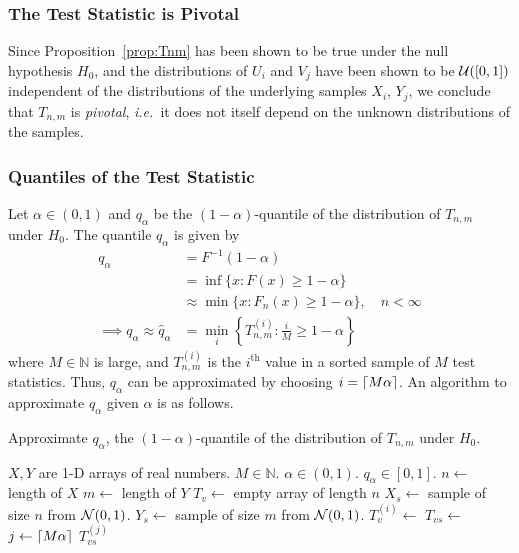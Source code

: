 \documentclass[letterpaper, oneside, reqno]{amsart}
\numberwithin{equation}{section}
\DeclarePairedDelimiter{\ceil}{\lceil}{\rceil}
\newcommand{\ie}{\emph{i.e.\ }}
\newcommand{\N}[2]{\mathcal{N}\mleft( #1, #2 \mright)}
\newcommand{\U}[2]{\mathcal{U}\mleft(\mleft[ #1, #2 \mright]\mright)}
\begin{document}
\subsubsection{The Test Statistic is Pivotal}
Since Proposition~\ref{prop:Tnm} has been shown to be true under the null hypothesis $H_0$, and the distributions of $U_i$
and $V_j$ have been shown to be $\U{0}{1}$ independent of the distributions of
the underlying samples $X_i$, $Y_j$, we conclude that $T_{n,m}$ is
\emph{pivotal}, \ie it does not itself depend on the unknown distributions of
the samples.

\clearpage
\subsubsection{Quantiles of the Test Statistic}
Let $\alpha \in (0, 1)$ and $q_\alpha$ be the $(1 - \alpha)$-quantile of the
distribution of $T_{n,m}$ under $H_0$. The quantile $q_\alpha$ is given by
\begin{align*}
  q_\alpha &= F^{-1}(1-\alpha) \\
           &= \inf\{x \colon F(x) \ge 1 - \alpha\} \\
           &\approx \min\{x \colon F_n(x) \ge 1 - \alpha\}, \quad n < \infty \\
           \implies q_\alpha \approx \hat{q}_\alpha &= \min_i \left\{
               T_{n,m}^{(i)} \colon \tfrac{i}{M} \ge 1 - \alpha \right\}
\end{align*}
where $M \in \mathbb{N}$ is large, and $T_{n,m}^{(i)}$ is the $i^\text{th}$
value in a sorted sample of $M$ test statistics. Thus, $q_\alpha$ can be
approximated by choosing $i = \ceil{M\alpha}$. An algorithm to approximate
$q_\alpha$ given $\alpha$ is as follows.

\begin{algorithm}[!h]
  \caption{Approximate $q_\alpha$, the $(1 - \alpha)$-quantile of the
distribution of $T_{n,m}$ under $H_0$.}
  \label{alg:ks_q}
  \begin{algorithmic}
    \Require $X, Y$ are 1-D arrays of real numbers. $M \in \mathbb{N}$. $\alpha
    \in (0, 1)$.
    \Ensure $q_\alpha \in [0, 1]$.
      \State $n \gets$ length of $X$
      \State $m \gets$ length of $Y$
      \State $T_v \gets$ empty array of length $n$
        \State $X_s \gets$ sample of size $n$ from $\N{0}{1}$.
        \State $Y_s \gets$ sample of size $m$ from $\N{0}{1}$.
        \State $T_v^{(i)} \gets$ 
      \EndFor
      \State $T_{vs} \gets$ 
      \State $j \gets \ceil*{M\alpha}$
      \State \Return $T_{vs}^{(j)}$
    \EndProcedure
  \end{algorithmic}
\end{algorithm}
\end{document}

